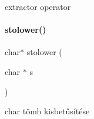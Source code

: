 extractor operator 

\mbox{\label{schtring_8cpp_a9d7d0d0ea2b8f0f7c6d53fe66fc0b301}} 
\paragraph{\texorpdfstring{stolower()}{stolower()}}
{\footnotesize\ttfamily char$\ast$ stolower (\begin{DoxyParamCaption}\item[{char $\ast$}]{s }\end{DoxyParamCaption})}



char tömb kisbetűsítése 

